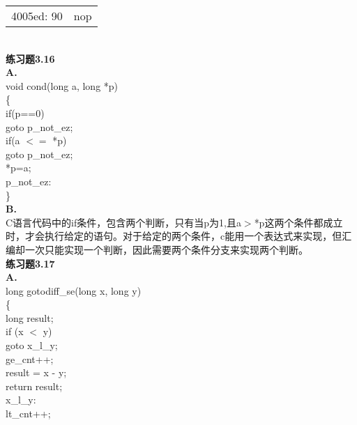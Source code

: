 \documentclass{article}
\begin{document}
\begin{CJK}{UTF8}{uyhei}
\begin{table}[htbp]
\begin{tabular}{m{10em}m{10em}}
4005ed: 90	&	nop 	\\
\end{tabular}
\end{table}	\\
\textbf{练习题3.16}	\\[2ex]
\textbf{A.}	\\
void cond(long a, long *p)				\\
\{							\\
	\hspace*{2em}	if(p==0)			\\
	\hspace*{4em}		goto p\_not\_ez;	\\
	\hspace*{2em}	if(a $<=$ *p)			\\
	\hspace*{4em}		goto p\_not\_ez;	\\
	\hspace*{2em}	*p=a;				\\
	\hspace*{2em}	p\_not\_ez:			\\
\}							\\[2ex]
\textbf{B.}	\\
C语言代码中的if条件，包含两个判断，只有当p为1,且a$>$*p这两个条件都成立时，才会执行给定的语句。对于给定的两个条件，c能用一个表达式来实现，但汇编却一次只能实现一个判断，因此需要两个条件分支来实现两个判断。	\\[3ex]
\textbf{练习题3.17}	\\[2ex]
\textbf{A.}	\\
long gotodiff\_se(long x, long y)	\\
\{	\\
	\hspace*{2em}	long result;		\\
	\hspace*{2em}	if (x $<$ y)		\\
	\hspace*{4em}		goto x\_l\_y;	\\
	\hspace*{2em}	ge\_cnt++;		\\
	\hspace*{2em}	result = x - y;		\\
	\hspace*{2em}	return result;		\\
	\hspace*{1em} x\_l\_y:			\\
	\hspace*{2em}	lt\_cnt++;		\\

\end{CJK}
\end{document}
